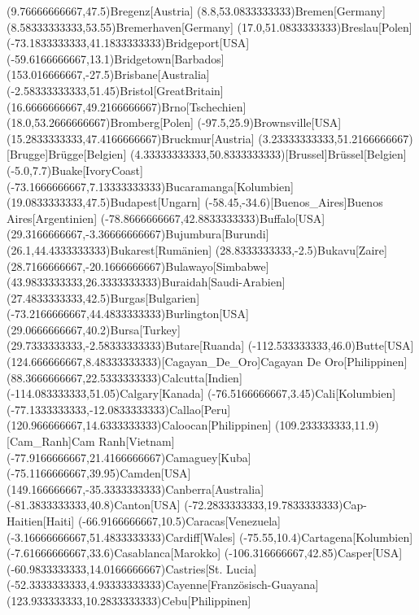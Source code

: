 \mapput(9.76666666667,47.5){Bregenz}[Austria]
\mapput(8.8,53.0833333333){Bremen}[Germany]
\mapput(8.58333333333,53.55){Bremerhaven}[Germany]
\mapput(17.0,51.0833333333){Breslau}[Polen]
\mapput(-73.1833333333,41.1833333333){Bridgeport}[USA]
\mapput(-59.6166666667,13.1){Bridgetown}[Barbados]
\mapput(153.016666667,-27.5){Brisbane}[Australia]
\mapput(-2.58333333333,51.45){Bristol}[GreatBritain]
\mapput(16.6666666667,49.2166666667){Brno}[Tschechien]
\mapput(18.0,53.2666666667){Bromberg}[Polen]
\mapput(-97.5,25.9){Brownsville}[USA]
\mapput(15.2833333333,47.4166666667){Bruckmur}[Austria]
\mapput(3.23333333333,51.2166666667)[Brugge]{Brügge}[Belgien]
\mapput(4.33333333333,50.8333333333)[Brussel]{Brüssel}[Belgien]
\mapput(-5.0,7.7){Buake}[IvoryCoast]
\mapput(-73.1666666667,7.13333333333){Bucaramanga}[Kolumbien]
\mapput(19.0833333333,47.5){Budapest}[Ungarn]
\mapput(-58.45,-34.6)[Buenos_Aires]{Buenos Aires}[Argentinien]
\mapput(-78.8666666667,42.8833333333){Buffalo}[USA]
\mapput(29.3166666667,-3.36666666667){Bujumbura}[Burundi]
\mapput(26.1,44.4333333333){Bukarest}[Rumänien]
\mapput(28.8333333333,-2.5){Bukavu}[Zaire]
\mapput(28.7166666667,-20.1666666667){Bulawayo}[Simbabwe]
\mapput(43.9833333333,26.3333333333){Buraidah}[Saudi-Arabien]
\mapput(27.4833333333,42.5){Burgas}[Bulgarien]
\mapput(-73.2166666667,44.4833333333){Burlington}[USA]
\mapput(29.0666666667,40.2){Bursa}[Turkey]
\mapput(29.7333333333,-2.58333333333){Butare}[Ruanda]
\mapput(-112.533333333,46.0){Butte}[USA]
\mapput(124.666666667,8.48333333333)[Cagayan_De_Oro]{Cagayan De Oro}[Philippinen]
\mapput(88.3666666667,22.5333333333){Calcutta}[Indien]
\mapput(-114.083333333,51.05){Calgary}[Kanada]
\mapput(-76.5166666667,3.45){Cali}[Kolumbien]
\mapput(-77.1333333333,-12.0833333333){Callao}[Peru]
\mapput(120.966666667,14.6333333333){Caloocan}[Philippinen]
\mapput(109.233333333,11.9)[Cam_Ranh]{Cam Ranh}[Vietnam]
\mapput(-77.9166666667,21.4166666667){Camaguey}[Kuba]
\mapput(-75.1166666667,39.95){Camden}[USA]
\mapput(149.166666667,-35.3333333333){Canberra}[Australia]
\mapput(-81.3833333333,40.8){Canton}[USA]
\mapput(-72.2833333333,19.7833333333){Cap-Haitien}[Haiti]
\mapput(-66.9166666667,10.5){Caracas}[Venezuela]
\mapput(-3.16666666667,51.4833333333){Cardiff}[Wales]
\mapput(-75.55,10.4){Cartagena}[Kolumbien]
\mapput(-7.61666666667,33.6){Casablanca}[Marokko]
\mapput(-106.316666667,42.85){Casper}[USA]
\mapput(-60.9833333333,14.0166666667){Castries}[St. Lucia]
\mapput(-52.3333333333,4.93333333333){Cayenne}[Französisch-Guayana]
\mapput(123.933333333,10.2833333333){Cebu}[Philippinen]
